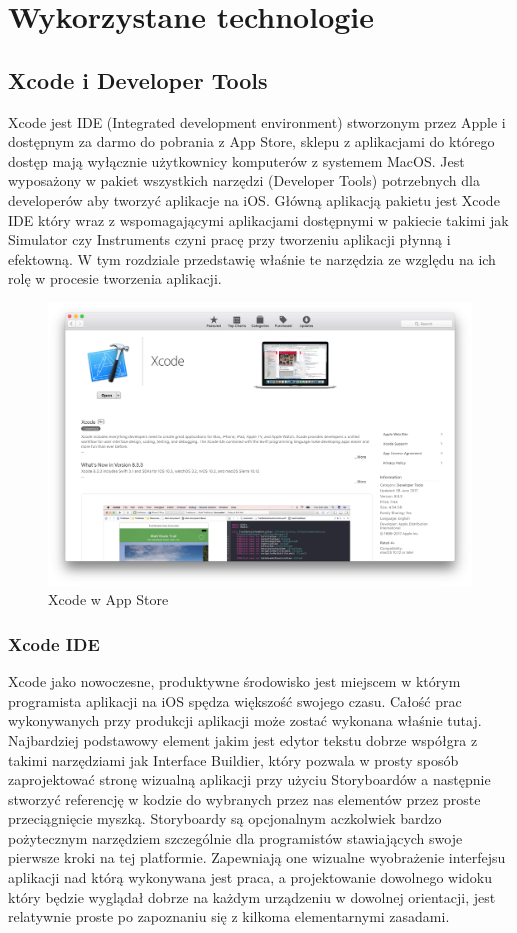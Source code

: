 \chapter{Wykorzystane technologie}

\section{Xcode i Developer Tools}
Xcode jest IDE (Integrated development environment) stworzonym przez Apple i dostępnym za darmo do pobrania z App Store, sklepu z aplikacjami do którego dostęp mają wyłącznie użytkownicy komputerów z systemem MacOS. Jest wyposażony w pakiet wszystkich narzędzi (Developer Tools) potrzebnych dla developerów aby tworzyć aplikacje na iOS. Główną aplikacją pakietu jest Xcode IDE który wraz z wspomagającymi aplikacjami dostępnymi w pakiecie takimi jak Simulator czy Instruments czyni pracę przy tworzeniu aplikacji płynną i efektowną. W tym rozdziale przedstawię właśnie te narzędzia ze względu na ich rolę w procesie tworzenia aplikacji.

\begin{figure}[ht!]
  \centering
  \includegraphics[width=120mm]{images/chapter-2-image-1-appstore.png}
  \caption{Xcode w App Store}
  \label{chapter-2-image-1-appstore}
\end{figure}

\subsection{Xcode IDE}
Xcode jako nowoczesne, produktywne środowisko jest miejscem w którym programista aplikacji na iOS spędza większość swojego czasu. Całość prac wykonywanych przy produkcji aplikacji może zostać wykonana właśnie tutaj. Najbardziej podstawowy element jakim jest edytor tekstu dobrze współgra z takimi narzędziami jak Interface Buildier, który pozwala w prosty sposób zaprojektować stronę wizualną aplikacji przy użyciu Storyboardów a następnie stworzyć referencję w kodzie do wybranych przez nas elementów przez proste przeciągnięcie myszką. Storyboardy są opcjonalnym aczkolwiek bardzo pożytecznym narzędziem szczególnie dla programistów stawiających swoje pierwsze kroki na tej platformie. Zapewniają one wizualne wyobrażenie interfejsu aplikacji nad którą wykonywana jest praca, a projektowanie dowolnego widoku który będzie wyglądał dobrze na każdym urządzeniu w dowolnej orientacji, jest relatywnie proste po zapoznaniu się z kilkoma elementarnymi zasadami.


